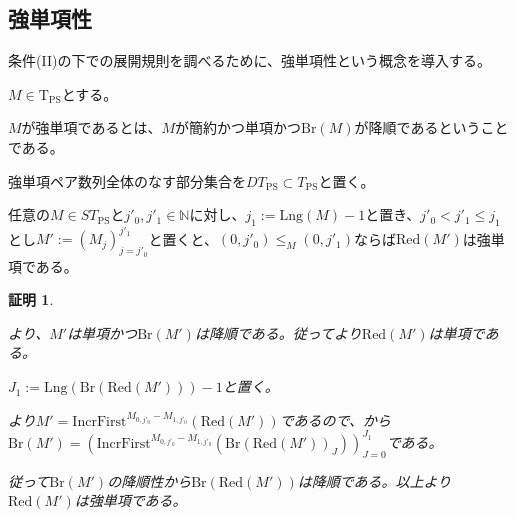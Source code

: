 \documentclass[dvipdfmx,uplatex]{jsarticle}
\theoremstyle{customnonumberbreakfortheorem}
\theoremstyle{customnonumberbreakforproof}
\newtheorem{hideableproof}{証明}
\begin{document}
\subsection{強単項性}

条件(II)の下での展開規則を調べるために、強単項性という概念を導入する。

\(M \in \textrm{T}_{\textrm{PS}}\)とする。
\begin{nenumerate}
	\item \(M\)が強単項であるとは、\(M\)が簡約かつ単項かつ\(\textrm{Br}(M)\)が降順であるということである。
	\item 強単項ペア数列全体のなす部分集合を\(DT_{\textrm{PS}} \subset T_{\textrm{PS}}\)と置く。
\end{nenumerate}

\begin{proposition}[標準形の直系先祖による切片の簡約化の強単項性]\label{標準形の直系先祖による切片の簡約化の強単項性}
	任意の\(M \in ST_{\textrm{PS}}\)と\(j'_0,j'_1 \in \mathbb{N}\)に対し、\(j_1 := \textrm{Lng}(M)-1\)と置き、\(j'_0 < j'_1 \leq j_1\)とし\(M' := (M_j)_{j=j'_0}^{j'_1} \)と置くと、\((0,j'_0) \leq_M (0,j'_1)\)ならば\(\textrm{Red}(M')\)は強単項である。
\end{proposition}

\begin{hideableproof}
	\begin{indented}
		\item {}より、\(M'\)は単項かつ\(\textrm{Br}(M')\)は降順である。従ってより\(\textrm{Red}(M')\)は単項である。
		\item \(J_1 := \textrm{Lng}(\textrm{Br}(\textrm{Red}(M')))-1\)と置く。
		\item {}より\(M' = \textrm{IncrFirst}^{M_{0,j'_0}-M_{1,j'_0}}(\textrm{Red}(M'))\)であるので、から\(\textrm{Br}(M') = (\textrm{IncrFirst}^{M_{0,j'_0}-M_{1,j'_0}}(\textrm{Br}(\textrm{Red}(M'))_J))_{J=0}^{J_1}\)である。
		\item 従って\(\textrm{Br}(M')\)の降順性から\(\textrm{Br}(\textrm{Red}(M'))\)は降順である。以上より\(\textrm{Red}(M')\)は強単項である。
	\end{indented}
\end{hideableproof}
\end{document}
